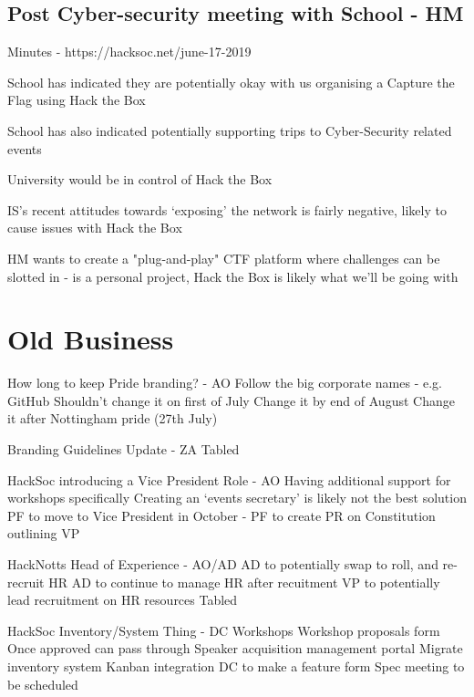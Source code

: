 \documentclass[11pt]{meetingmins}
\begin{document}
\subsection{Post Cyber-security meeting with School - HM}
\begin{hiddensubitems}
	\item Minutes - https://hacksoc.net/june-17-2019
	\item School has indicated they are potentially okay with us organising a Capture the Flag using Hack the Box
	\item School has also indicated potentially supporting trips to Cyber-Security related events
	\item University would be in control of Hack the Box
	\item IS's recent attitudes towards `exposing' the network is fairly negative, likely to cause issues with Hack the Box
	\item HM wants to create a "plug-and-play" CTF platform where challenges can be slotted in - is a personal project, Hack the Box is likely what we'll be going with
\end{hiddensubitems}


\section{Old Business}
\begin{items}
	\item How long to keep Pride branding? - AO
		\subitem Follow the big corporate names - e.g. GitHub
		\subitem Shouldn't change it on first of July
		\subitem Change it by end of August
		\subitem Change it after Nottingham pride (27th July)
	\item Branding Guidelines Update - ZA
		\subitem Tabled
	\item HackSoc introducing a Vice President Role - AO
		\subitem Having additional support for workshops specifically
		\subitem Creating an `events secretary' is likely not the best solution
		\subitem PF to move to Vice President in October - PF to create PR on Constitution outlining VP
	\item HackNotts Head of Experience - AO/AD
		\subitem AD to potentially swap to roll, and re-recruit HR
		\subitem AD to continue to manage HR after recuitment
		\subitem VP to potentially lead recruitment on HR resources
		\subitem Tabled
	\item HackSoc Inventory/System Thing - DC
		\subitem Workshops
			\subsubitem Workshop proposals form
			\subsubitem Once approved can pass through 
		\subitem Speaker acquisition management portal
		\subitem Migrate inventory system
		\subitem Kanban integration
		\subitem DC to make a feature form
		\subitem Spec meeting to be scheduled
\end{items}
\end{document}
